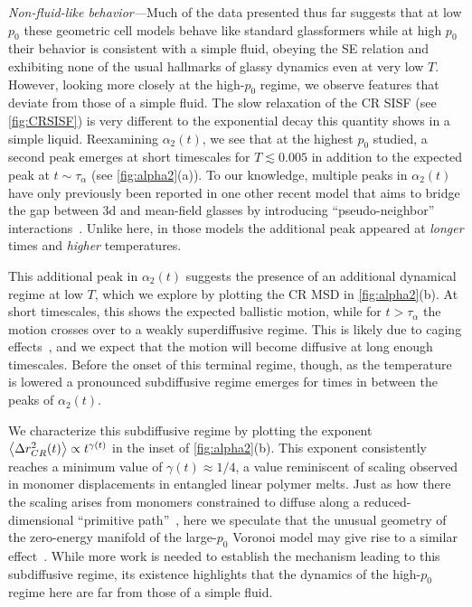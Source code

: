 \documentclass[amsmath,amssymb,prl,reprint,twocolumn]{revtex4-2}
\begin{document}
\emph{Non-fluid-like behavior---}Much of the data presented thus far suggests that at low $p_0$ these geometric cell models behave like standard glassformers while at high $p_0$ their behavior is consistent with a simple fluid, obeying the SE relation and exhibiting none of the usual hallmarks of glassy dynamics even at very low $T$.
However, looking more closely at the high-$p_0$ regime, we observe features that deviate from those of a simple fluid. 
The slow relaxation of the CR SISF (see \cref{fig:CRSISF}) is very different to the exponential decay this quantity shows in a simple liquid. 
Reexamining $\alpha_2(t)$, we see that at the highest $p_0$ studied, a second peak emerges at short timescales for $T\lesssim 0.005$ in addition to the expected peak at $t\sim\tau_\alpha$ (see \cref{fig:alpha2}(a)).
To our knowledge, multiple peaks in $\alpha_2(t)$ have only previously been reported in one other recent model that aims to bridge the gap between 3d and mean-field glasses by introducing ``pseudo-neighbor'' interactions~\cite{Nandi2021}. 
Unlike here, in those models the additional peak appeared at \emph{longer} times and \emph{higher} temperatures.




This additional peak in $\alpha_2(t)$ suggests the presence of an additional dynamical regime at low $T$, which we explore by plotting the CR MSD in \cref{fig:alpha2}(b).
At short timescales, this shows the expected ballistic motion, while for $t>\tau_{\alpha}$ the motion crosses over to a weakly superdiffusive regime. 
This is likely due to caging effects~\cite{Weeks2002,Flenner2019}, and we expect that the motion will become diffusive at long enough timescales.
Before the onset of this terminal regime, though, as the temperature is lowered a pronounced subdiffusive regime emerges for times in between the peaks of $\alpha_2(t)$.

We characterize this subdiffusive regime by plotting the exponent $\expval{\Delta r^2_{CR} (t)}\propto t^{\gamma(t)}$ in the inset of \cref{fig:alpha2}(b).
This exponent consistently reaches a minimum value of $\gamma(t) \approx 1/4$, a
value reminiscent of scaling observed in monomer displacements in entangled linear polymer melts.
Just as how there the scaling arises from monomers constrained to diffuse along a reduced-dimensional ``primitive path''~\cite{Rubinstein2003}, here we speculate that the unusual geometry of the zero-energy manifold of the large-$p_0$ Voronoi model may give rise to a similar effect~\cite{Pinto2022,Li2021}.
While more work is needed to establish the mechanism leading to this subdiffusive regime, its existence highlights that the dynamics of the high-$p_0$ regime here are far from those of a simple fluid.
\end{document}
